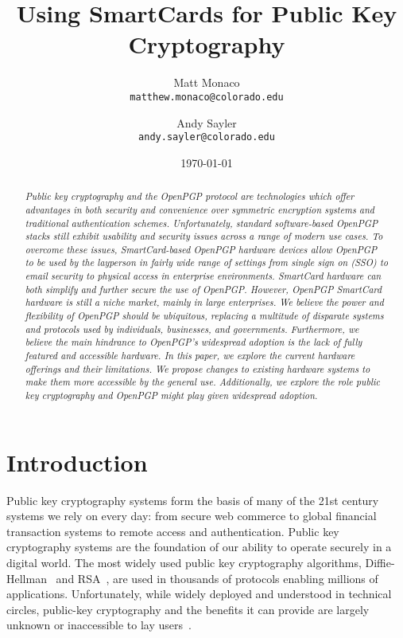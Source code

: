 \documentclass[11pt, twocolumn]{article}
\begin{document}
\title{Using SmartCards for Public Key Cryptography}

\author{
  Matt Monaco \\ \texttt{matthew.monaco@colorado.edu} \and
  Andy Sayler \\ \texttt{andy.sayler@colorado.edu}
}

\date{\today}

\maketitle

\begin{abstract}
\emph{Public key cryptography and the OpenPGP protocol are
  technologies which offer advantages in both security and convenience
  over symmetric encryption systems and traditional authentication
  schemes. Unfortunately, standard software-based OpenPGP stacks still
  exhibit usability and security issues across a range of modern use
  cases. To overcome these issues, SmartCard-based OpenPGP hardware
  devices allow OpenPGP to be used by the layperson in fairly wide
  range of settings from single sign on (SSO) to email security to
  physical access in enterprise environments. SmartCard hardware can
  both simplify and further secure the use of OpenPGP. However,
  OpenPGP SmartCard hardware is still a niche market, mainly in large
  enterprises. We believe the power and flexibility of OpenPGP should
  be ubiquitous, replacing a multitude of disparate systems and
  protocols used by individuals, businesses, and
  governments. Furthermore, we believe the main hindrance to OpenPGP's
  widespread adoption is the lack of fully featured and accessible
  hardware. In this paper, we explore the current hardware offerings
  and their limitations. We propose changes to existing hardware
  systems to make them more accessible by the general
  use. Additionally, we explore the role public key cryptography and
  OpenPGP might play given widespread adoption.}
\end{abstract}

\section{Introduction}
\label{sec:intro}

Public key cryptography systems form the basis of many of the 21st
century systems we rely on every day: from secure web commerce to
global financial transaction systems to remote access and
authentication. Public key cryptography systems are the foundation of
our ability to operate securely in a digital world. The most widely
used public key cryptography algorithms,
Diffie-Hellman~\cite{diffie1976} and RSA~\cite{rivest1978}, are used
in thousands of protocols enabling millions of
applications. Unfortunately, while widely deployed and understood in
technical circles, public-key cryptography and the benefits it can
provide are largely unknown or inaccessible to lay
users~\cite{whitten1999}.
\end{document}
